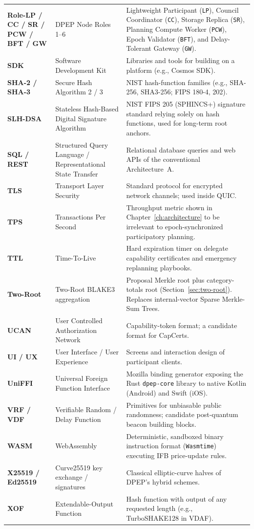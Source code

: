 \documentclass[10pt,twoside,openany]{book}
\theoremstyle{dpepstyle}
\begin{document}
{\begin{longtable}{L{0.92in} L{1.75in} L{1.95in}}
\textbf{Role-LP / CC / SR / PCW / BFT / GW} & DPEP Node Roles 1--6 & Lightweight Participant (\texttt{LP}), Council Coordinator (\texttt{CC}), Storage Replica (\texttt{SR}), Planning Compute Worker (\texttt{PCW}), Epoch Validator (\texttt{BFT}), and Delay-Tolerant Gateway (\texttt{GW}). \\
\textbf{SDK} & Software Development Kit & Libraries and tools for building on a platform (e.g., Cosmos SDK). \\
\textbf{SHA-2 / SHA-3} & Secure Hash Algorithm 2 / 3 & NIST hash-function families (e.g., SHA-256, SHA3-256; FIPS 180-4, 202). \\
\textbf{SLH-DSA} & Stateless Hash-Based Digital Signature Algorithm & NIST FIPS 205 (SPHINCS+) signature standard relying solely on hash functions, used for long-term root anchors. \\
\textbf{SQL / REST} & Structured Query Language / Representational State Transfer & Relational database queries and web APIs of the conventional Architecture~A. \\
\textbf{TLS} & Transport Layer Security & Standard protocol for encrypted network channels; used inside QUIC. \\
\textbf{TPS} & Transactions Per Second & Throughput metric shown in Chapter~\ref{ch:architecture} to be irrelevant to epoch-synchronized participatory planning. \\
\textbf{TTL} & Time-To-Live & Hard expiration timer on delegate capability certificates and emergency replanning playbooks. \\
\textbf{Two-Root} & Two-Root BLAKE3 aggregation & Proposal Merkle root plus category-totals root (Section~\ref{sec:two-root}). Replaces internal-vector Sparse Merkle-Sum Trees. \\
\textbf{UCAN} & User Controlled Authorization Network & Capability-token format; a candidate format for CapCerts. \\
\textbf{UI / UX} & User Interface / User Experience & Screens and interaction design of participant clients. \\
\textbf{UniFFI} & Universal Foreign Function Interface & Mozilla binding generator exposing the Rust \texttt{dpep-core} library to native Kotlin (Android) and Swift (iOS). \\
\textbf{VRF / VDF} & Verifiable Random / Delay Function & Primitives for unbiasable public randomness; candidate post-quantum beacon building blocks. \\
\textbf{WASM} & WebAssembly & Deterministic, sandboxed binary instruction format (\texttt{Wasmtime}) executing IFB price-update rules. \\
\textbf{X25519 / Ed25519} & Curve25519 key exchange / signatures & Classical elliptic-curve halves of DPEP's hybrid schemes. \\
\textbf{XOF} & Extendable-Output Function & Hash function with output of any requested length (e.g., TurboSHAKE128 in VDAF). \\
\end{longtable}}
\end{document}
